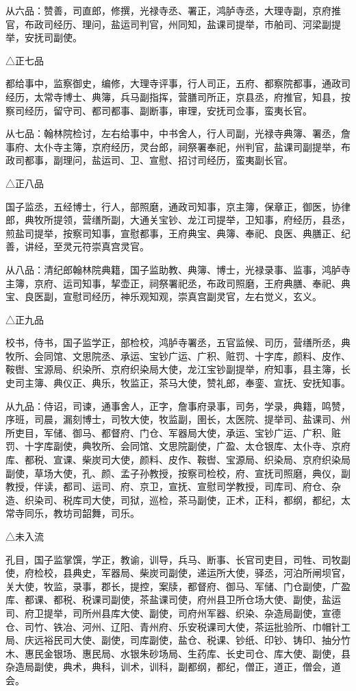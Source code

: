 \documentclass[a4paper,12pt,UTF8,twoside]{ctexbook}
\begin{document}
    从六品：赞善，司直郎，修撰，光禄寺丞、署正，鸿胪寺丞，大理寺副，京府推官，布政司经历、理问，盐运司判官，州同知，盐课司提举，市舶司、河梁副提举，安抚司副使。
    
    △正七品
    
    都给事中，监察御史，编修，大理寺评事，行人司正，五府、都察院都事，通政司经历，太常寺博士、典簿，兵马副指挥，营膳司所正，京县丞，府推官，知县，按察司经历，留守司、都司都事、副断事，审理，安抚司佥事，蛮夷长官。
    
    从七品：翰林院检讨，左右给事中，中书舍人，行人司副，光禄寺典簿、署丞，詹事府、太仆寺主簿，京府经历，灵台郎，祠祭署奉祀，州判官，盐课司副提举，布政司都事，副理问，盐运司、卫、宣慰、招讨司经历，蛮夷副长官。
    
    △正八品
    
    国子监丞，五经博士，行人，部照磨，通政司知事，京主簿，保章正，御医，协律郎，典牧所提领，营缮所副，大通关宝钞、龙江司提举，卫知事，府经历，县丞，煎盐司提举，按察司知事，宣慰都事，王府典宝、典簿、奉祀、良医、典膳正、纪善，讲经，至灵元符崇真宫灵官。
    
    从八品：清纪郎翰林院典籍，国子监助教、典簿、博士，光禄录事、监事，鸿胪寺主簿，京府、运司知事，挈壶正，祠祭署祀丞，布政司照磨，王府典膳、奉祀、典宝、良医副，宣慰司经历，神乐观知观，崇真宫副灵官，左右觉义，玄义。
    
    △正九品
    
    校书，侍书，国子监学正，部检校，鸿胪寺署丞，五官监候、司历，营缮所丞，典牧所、会同馆、文思院丞、承运、宝钞广运、广积、赃罚、十字库，颜料、皮作、鞍辔、宝源局、织染所、京府织染局大使，龙江宝钞副提举，府知事，县主簿，长史司主簿、典仪正、典乐，牧监正，茶马大使，赞礼郎，奉銮、宣抚、安抚知事。
    
    从九品：侍诏，司谏，通事舍人，正字，詹事府录事，司务，学录，典籍，鸣赞，序班，司晨，漏刻博士，司牧大使，牧监副，圉长，太医院、提举司、盐课司、州所吏目，军储、御马、都督府、门仓、军器局大使，承运、宝钞广运、广积、赃罚、十字库副使，典牧所、会同馆、文思院副使，广盈、太仓银库、太仆寺、京府库、都税、宣课、柴炭司大使，颜料、皮作、鞍辔、宝源局、织染局、京府织染局副使，草场大使，孔、颜、孟子孙教授，按察司检校，府、宣抚司照磨，典仪，副教授，伴读，都司、运司、府、京卫，宣抚、宣慰司学教授，司库司、府仓、杂造、织染司、税库司大使，司狱，巡检，茶马副使，正术，正科，都纲，都纪，太常寺同乐，教坊司韶舞，司乐。
    
    △未入流
    
    孔目，国子监掌馔，学正，教谕，训导，兵马、断事、长官司吏目，司牲、司牧副使，府检校，县典史，军器局、柴炭司副使，递运所大使，驿丞，河泊所闸坝官，关大使，牧监，录事，郡长，提控，案牍，都督府、御马、军储、门仓副使，广盈库、都课、都税、税课司副使，茶盐课司使，府州县卫所仓场大使、副使，盐运司、府卫提举，司所州县库大使、副使，司府州军器、织染、杂造局副使，宣德仓、司竹、铁冶、河州、辽阳、青州府、乐安税课司大使，茶运批验所、巾帽针工局、庆远裕民司大使、副使，司库副使，盐仓、税课、钞纸、印钞、铸印、抽分竹木、惠民金银场、惠民局、水银朱砂场局、生药库、长史司仓、库大使、副使，县杂造局副使，典术，典科，训术，训科，副都纲，都纪，僧正，道正，僧会，道会。
    
\end{document}
